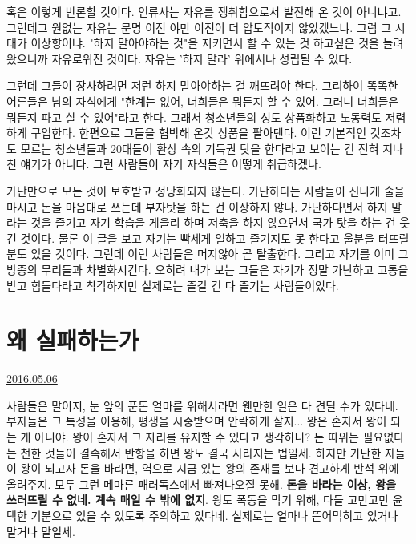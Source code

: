 혹은 이렇게 반론할 것이다. 인류사는 자유를 쟁취함으로서 발전해 온 것이 아니냐고.
그런데그 원없는 자유는 문명 이전 야만 이전이 더 압도적이지 않았겠느냐. 그럼 그 시대가 이상향이냐.
"하지 말아야하는 것"을 지키면서 할 수 있는 것 하고싶은 것을 늘려왔으니까 자유로워진 것이다.
자유는 '하지 말라' 위에서나 성립될 수 있다.
\vspace{5mm}

그런데 그들이 장사하려면 저런 하지 말아야하는 걸 깨뜨려야 한다.
그리하여 똑똑한 어른들은 남의 자식에게 "한계는 없어, 너희들은 뭐든지 할 수 있어. 그러니 너희들은 뭐든지 파고 살 수 있어"라고 한다.
그래서 청소년들의 성도 상품화하고 노동력도 저렴하게 구입한다. 한편으로 그들을 협박해 온갖 상품을 팔아댄다.
이런 기본적인 것조차도 모르는 청소년들과 20대들이 환상 속의 기득권 탓을 한다라고 보이는 건 전혀 지나친 얘기가 아니다.
그런 사람들이 자기 자식들은 어떻게 취급하겠나.
\vspace{5mm}

가난만으로 모든 것이 보호받고 정당화되지 않는다.
가난하다는 사람들이 신나게 술을 마시고 돈을 마음대로 쓰는데 부자탓을 하는 건 이상하지 않나.
가난하다면서 하지 말라는 것을 즐기고 자기 학습을 게을리 하며 저축을 하지 않으면서 국가 탓을 하는 건 웃긴 것이다.
물론 이 글을 보고 자기는 빡세게 일하고 즐기지도 못 한다고 울분을 터뜨릴 분도 있을 것이다.
그런데 이런 사람들은 머지않아 곧 탈출한다. 그리고 자기를 이미 그 방종의 무리들과 차별화시킨다.
오히려 내가 보는 그들은 자기가 정말 가난하고 고통을 받고 힘들다라고 착각하지만 실제로는 즐길 건 다 즐기는 사람들이었다.
\vspace{5mm}





\section{왜 실패하는가}
\href{https://www.kockoc.com/Apoc/762686}{2016.05.06}

\vspace{5mm}

사람들은 말이지, 눈 앞의 푼돈 얼마를 위해서라면 웬만한 일은 다 견딜 수가 있다네.
부자들은 그 특성을 이용해, 평생을 시중받으며 안락하게 살지...
왕은 혼자서 왕이 되는 게 아니야. 왕이 혼자서 그 자리를 유지할 수 있다고 생각하나?
돈 따위는 필요없다는 천한 것들이 결속해서 반항을 하면 왕도 결국 사라지는 법일세.
하지만 가난한 자들이 왕이 되고자 돈을 바라면, 역으로 지금 있는 왕의 존재를 보다 견고하게 반석 위에 올려주지.
모두 그런 메마른 패러독스에서 빠져나오질 못해. \textbf{돈을 바라는 이상, 왕을 쓰러뜨릴 수 없네. 계속 매일 수 밖에 없지}.
왕도 폭동을 막기 위해, 다들 고만고만 윤택한 기분으로 있을 수 있도록 주의하고 있다네. 실제로는 얼마나 뜯어먹히고 있거나 말거나 말일세.
\vspace{5mm}

